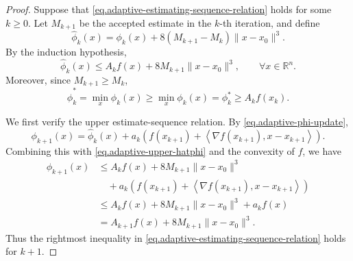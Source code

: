 \begin{itemize}
{\begin{proof}
                  Suppose that \eqref{eq.adaptive-estimating-sequence-relation} holds for some \(k\ge0\). Let \(M_{k+1}\) be the accepted estimate in the \(k\)-th iteration, and define
                  \[
                      \widehat \phi_k(x)
                      =
                      \phi_k(x)+8(M_{k+1}-M_k)\|x-x_0\|^3.
                  \]
                  By the induction hypothesis,
                  \begin{equation}
                      \label{eq.adaptive-upper-hatphi}
                      \widehat \phi_k(x)
                      \le
                      A_k f(x)+8M_{k+1}\|x-x_0\|^3,
                      \qquad
                      \forall x\in\mathbb R^n.
                  \end{equation}
                  Moreover, since \(M_{k+1}\ge M_k\),
                  \begin{equation}
                      \label{eq.adaptive-hatphi-star}
                      \widehat \phi_k^*
                      =
                      \min_x \widehat \phi_k(x)
                      \ge
                      \min_x \phi_k(x)
                      =
                      \phi_k^*
                      \ge
                      A_k f(x_k).
                  \end{equation}

                  We first verify the upper estimate-sequence relation. By \eqref{eq.adaptive-phi-update},
                  \[
                      \phi_{k+1}(x)
                      =
                      \widehat \phi_k(x)
                      +
                      a_k
                      \left(
                      f(x_{k+1})
                      +
                      \left\langle \nabla f(x_{k+1}),x-x_{k+1}\right\rangle
                      \right).
                  \]
                  Combining this with \eqref{eq.adaptive-upper-hatphi} and the convexity of \(f\), we have
                  \begin{align*}
                      \phi_{k+1}(x)
                       & \le
                      A_k f(x)+8M_{k+1}\|x-x_0\|^3          \\
                       & \quad
                      +
                      a_k
                      \left(
                      f(x_{k+1})
                      +
                      \left\langle \nabla f(x_{k+1}),x-x_{k+1}\right\rangle
                      \right)                               \\
                       & \le
                      A_k f(x)+8M_{k+1}\|x-x_0\|^3+a_k f(x) \\
                       & =
                      A_{k+1}f(x)+8M_{k+1}\|x-x_0\|^3.
                  \end{align*}
                  Thus the rightmost inequality in \eqref{eq.adaptive-estimating-sequence-relation} holds for \(k+1\).


\end{proof}}
\end{itemize}
